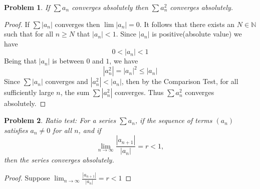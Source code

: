 \documentclass[12pt]{article}
\newtheorem{problem}{Problem}
\newcommand{\NN}{\ensuremath{\mathbb N}}
\begin{document}
\begin{problem} %
If $\sum a_n$ converges absolutely then $\sum a_n^2$ converges absolutely.
\end{problem}

\begin{proof}
If $\sum |a_n|$ converges then $\lim |a_n| = 0$. It follows that there exists an $N \in \NN$ such that for all $n \geq N$ that $|a_n| < 1$. Since 
$|a_n|$ is positive(absolute value) we have
$$0 < |a_n| < 1$$
Being that $|a_n|$ is between $0$ and $1$, we have
$$|a_n^2| = |a_n|^2 \leq |a_n|$$
Since $\sum |a_n|$ converges and $|a_n^2| < |a_n|$, then by the Comparison Test, for all sufficiently large $n$, the sum $\sum |a_n^2|$ converges.
Thus $\sum a_n^2$ converges absolutely.
\end{proof}


\begin{problem} %
Ratio test:  For a series $\sum a_n$, if the sequence of terms $(a_n)$ satisfies $a_n\ne 0$ for all $n$, and if
	$$\lim_{n\to\infty} \frac{|a_{n+1}|}{|a_n|} = r < 1,$$
then the series converges absolutely.
\end{problem}


\begin{proof}
Suppose $\lim_{n\to\infty} \frac{|a_{n+1}|}{|a_n|} = r < 1$
\end{proof}
\end{document}
